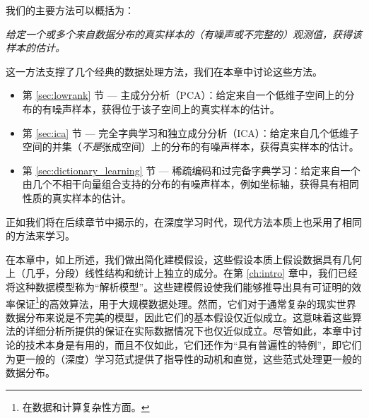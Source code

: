 \documentclass[../../book-main.tex]{subfiles}
\begin{document}
我们的主要方法可以概括为：
\begin{tcolorbox}
    \textit{给定一个或多个来自数据分布的真实样本的（有噪声或不完整的）观测值，获得该样本的估计。}
\end{tcolorbox}
这一方法支撑了几个经典的数据处理方法，我们在本章中讨论这些方法。
\begin{itemize}
    \item 第 \ref{sec:lowrank} 节 --- 主成分分析（PCA）：给定来自一个低维子空间上的分布的有噪声样本，获得位于该子空间上的真实样本的估计。
    \item 第 \ref{sec:ica} 节 --- 完全字典学习和独立成分分析（ICA）：给定来自几个低维子空间的并集（\textit{不是}张成空间）上的分布的有噪声样本，获得真实样本的估计。
    \item 第 \ref{sec:dictionary_learning} 节 --- 稀疏编码和过完备字典学习：给定来自一个由几个不相干向量组合支持的分布的有噪声样本，例如坐标轴，获得具有相同性质的真实样本的估计。
\end{itemize}
正如我们将在后续章节中揭示的，在深度学习时代，现代方法本质上也采用了相同的方法来学习。

在本章中，如上所述，我们做出简化建模假设，这些假设本质上假设数据具有几何上（几乎，分段）线性结构和统计上独立的成分。在第 \ref{ch:intro} 章中，我们已经将这种数据模型称为“解析模型”。这些建模假设使我们能够推导出具有可证明的效率保证\footnote{在数据和计算复杂性方面。}的高效算法，用于大规模数据处理。然而，它们对于通常复杂的现实世界数据分布来说是不完美的模型，因此它们的基本假设仅近似成立。这意味着这些算法的详细分析所提供的保证在实际数据情况下也仅近似成立。尽管如此，本章中讨论的技术本身是有用的，而且不仅如此，它们还作为“具有普遍性的特例”，即它们为更一般的（深度）学习范式提供了指导性的动机和直觉，这些范式处理更一般的数据分布。%

\end{document}
